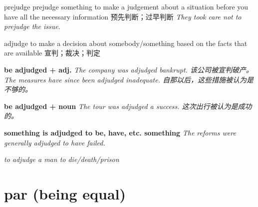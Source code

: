 \begin{DefWord}{prejudge}
    prejudge something to make a judgement about a situation before you have all the necessary information 预先判断；过早判断
    \textit{They took care not to prejudge the issue.}
\end{DefWord}

\begin{DefWord}{adjudge}
    to make a decision about somebody/something based on the facts that are available 宣判；裁决；判定

    \textbf{be adjudged + adj.} \textit{The company was adjudged bankrupt. 该公司被宣判破产。}
    \textit{The measures have since been adjudged inadequate. 自那以后，这些措施被认为是不够的。}

    \textbf{be adjudged + noun}\textit{ The tour was adjudged a success. 这次出行被认为是成功的。}

    \textbf{something is adjudged to be, have, etc. something} \textit{The reforms were generally adjudged to have failed.}

    \textit{to adjudge a man to die/death/prison}

\end{DefWord}






\section{par (being equal)}


